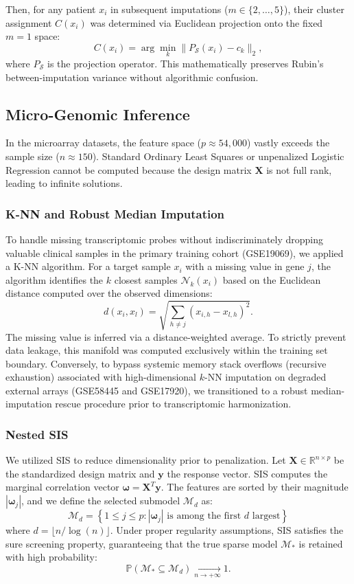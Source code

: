 \documentclass[a4paper,11pt,twocolumn]{article}
\begin{document}
	Then, for any patient $x_i$ in subsequent imputations ($m \in \{2, \dots, 5\}$), their cluster assignment $C(x_i)$ was determined via Euclidean projection onto the fixed $m=1$ space:
	$$ C(x_i) = \arg\min_{k} \| P_{\mathcal{S}}(x_i) - c_k \|_2, $$ 
	where $P_{\mathcal{S}}$ is the projection operator. This mathematically preserves Rubin’s between-imputation variance without algorithmic confusion.
	
	\subsection{Micro-Genomic Inference}
	In the microarray datasets, the feature space ($p \approx 54,000$) vastly exceeds the sample size ($n \approx 150$). Standard Ordinary Least Squares or unpenalized Logistic Regression cannot be computed because the design matrix $\mathbf{X}$ is not full rank, leading to infinite solutions.
	
	\subsubsection{K-NN and Robust Median Imputation}
	To handle missing transcriptomic probes without indiscriminately dropping valuable clinical samples in the primary training cohort (GSE19069), we applied a K-NN algorithm. For a target sample $x_i$ with a missing value in gene $j$, the algorithm identifies the $k$ closest samples $\mathcal{N}_k(x_i)$ based on the Euclidean distance computed over the observed dimensions: 
	$$d(x_i, x_l) = \sqrt{\sum_{h \neq j} (x_{i,h} - x_{l,h})^2}.$$ 
	The missing value is inferred via a distance-weighted average. To strictly prevent data leakage, this manifold was computed exclusively within the training set boundary. Conversely, to bypass systemic memory stack overflows (recursive exhaustion) associated with high-dimensional $k$-NN imputation on degraded external arrays (GSE58445 and GSE17920), we transitioned to a robust median-imputation rescue procedure prior to transcriptomic harmonization.
	
	\subsubsection{Nested SIS}
	We utilized SIS \cite{Fan2008} to reduce dimensionality prior to penalization. Let $\mathbf{X} \in \mathbb{R}^{n \times p}$ be the standardized design matrix and $\mathbf{y}$ the response vector. SIS computes the marginal correlation vector $\boldsymbol{\omega} = \mathbf{X}^T \mathbf{y}$. The features are sorted by their magnitude $|\boldsymbol{\omega}_j|$, and we define the selected submodel $\mathcal{M}_d$ as:
	$$ \mathcal{M}_d = \left\{ 1 \le j \le p : |\boldsymbol{\omega}_j| \text{ is among the first } d \text{ largest} \right\} $$
	where $d = \lfloor n/\log(n) \rfloor$. Under proper regularity assumptions, SIS satisfies the sure screening property, guaranteeing that the true sparse model $\mathcal{M}_*$ is retained with high probability: 
	$$\mathbb{P}(\mathcal{M}_* \subseteq \mathcal{M}_d) \underset{n\rightarrow+\infty}{\longrightarrow} 1.$$ 
	
\end{document}
